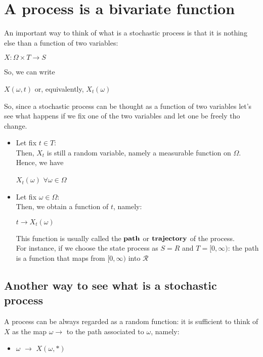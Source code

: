 \section{A process is a bivariate function}
An important way to think of what is a stochastic process is that it is nothing else than a function of two variables:
\begin{center}
    $X: \Omega \times T \longrightarrow S$
\end{center}
So, we can write 
\begin{center}
    $X(\omega, t)$ or, equivalently, $X_t(\omega)$
\end{center}

So, since a stochastic process can be thought as a function of two variables let's see what happens if we fix one of the two variables and let one be freely tho change. 

\begin{itemize}
    \item Let fix $t \in T$: \\
        Then, $X_t$ is still a random variable, namely a measurable function on $\Omega$.\\
        Hence, we have 
        \begin{center}
            $X_t(\omega)$ $\forall \omega \in \Omega$
        \end{center}
    \item Let fix $\omega \in \Omega$: \\
        Then, we obtain a function of $t$, namely:
        \begin{center}
            $t \longrightarrow X_t(\omega)$
        \end{center}
        This function is usually called the $\bold{path}$ or $\bold{trajectory}$ of the process.\\
        For instance, if we choose the state process as $S = R$ and $T = [0, \infty)$: the path is a function that maps from $[0, \infty)$ into $\mathcal{R}$
\end{itemize}

\subsection{Another way to see what is a stochastic process}
A process can be always regarded as a random function: it is sufficient to think of $X$ as the map $\omega \longrightarrow$ to the path associated to $\omega$, namely:
\begin{center}
    \begin{itemize}
        \item $\omega$ $\longrightarrow$ $X(\omega, *)$
    \end{itemize}
\end{center}

